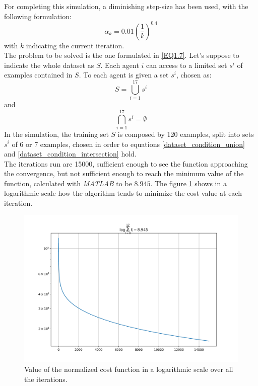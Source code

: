 \documentclass[a4paper,11pt,oneside]{book}
\begin{document}
For completing this simulation, a diminishing step-size has been used, with the following formulation:
\begin{equation}
	\alpha_k = 0.01 \left( \dfrac{1}{k} \right) ^{0.4}
\end{equation}
with $k$ indicating the current iteration.\\
The problem to be solved is the one formulated in \ref{EQ1.7}. Let's suppose to indicate the whole dataset as $S$. Each agent $i$ can access to a limited set $s^i$ of examples contained in $S$. To each agent is given a set $s^i$, chosen as:
\begin{equation}
	\label{dataset_condition_union}
	S = \bigcup\limits_{i=1}^{17} s^i
\end{equation}
and 
\begin{equation}
\label{dataset_condition_intersection}
\bigcap\limits_{i=1}^{17} s^i = \emptyset
\end{equation}
In the simulation, the training set $S$ is composed by 120 examples, split into sets $s^i$ of 6 or 7 examples, chosen in order to equations \ref{dataset_condition_union} and \ref{dataset_condition_intersection} hold.  \\
The iterations run are 15000, sufficient enough to see the function approaching the convergence, but not sufficient enough to reach the minimum value of the function, calculated with \textit{MATLAB} to be $8.945$. The figure \ref{log_cost} shows in a logarithmic scale how the algorithm tends to minimize the cost value at each iteration. \\
\begin{figure}[hb]
	\centering
	\includegraphics[scale=0.4]{figs/cost_log_scale}
	\caption{Value of the normalized cost function in a logarithmic scale over all the iterations. }
	\label{log_cost}
\end{figure}
\end{document}
